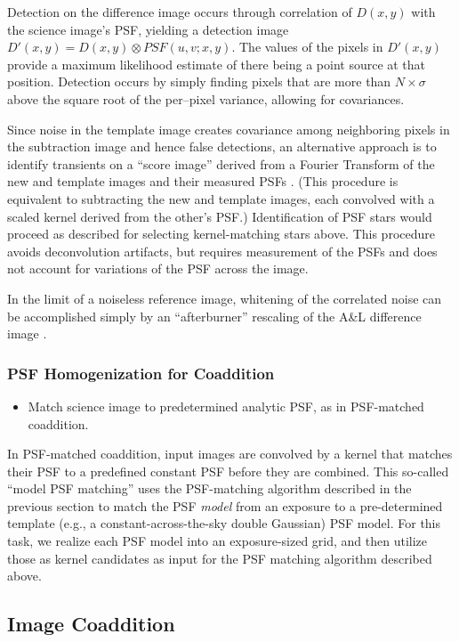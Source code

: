 Detection on the difference image occurs through correlation of $D(x,y)$ with the science image's PSF, yielding a detection image $D'(x,y) = D(x,y) \otimes PSF(u,v;x,y)$. The values of the pixels in $D'(x,y)$ provide a maximum likelihood estimate of there being a point source at that position.  Detection occurs by simply finding pixels that are more than $N \times \sigma$ above the square root of the per--pixel variance, allowing for covariances.

Since noise in the template image creates
covariance among neighboring pixels in the subtraction image and hence
false detections,
an alternative approach is to
identify transients on a
``score image'' derived from a Fourier Transform of the new and template
images and their measured PSFs \citep{2016ApJ...830...27Z}.
(This procedure is equivalent to
subtracting the new and template images, each convolved with a scaled
kernel derived from the other's PSF.)
Identification of PSF stars would
proceed as described for selecting kernel-matching stars above.  This
procedure avoids deconvolution artifacts, but requires measurement of the
PSFs and does not account for variations of the PSF across the image.

In the limit of a noiseless reference image, whitening of the correlated
noise can be accomplished simply by
an ``afterburner'' rescaling of the A\&L difference image .

\subsubsection{PSF Homogenization for Coaddition}
\label{sec:acPSFHomogenization}
\begin{itemize}
\item Match science image to predetermined analytic PSF, as in PSF-matched coaddition.
\end{itemize}

In PSF-matched coaddition, input images are convolved by a kernel that matches their PSF to a predefined constant PSF before they are combined. This so-called ``model PSF matching'' uses the PSF-matching algorithm described in the previous section to match the PSF \emph{  model} from an exposure to a pre-determined template (e.g., a constant-across-the-sky double Gaussian) PSF model. For this task, we realize each PSF model into an exposure-sized grid, and then utilize those as kernel candidates as input for the PSF matching algorithm described above.

\subsection{Image Coaddition}
\label{sec:acCoaddition}

